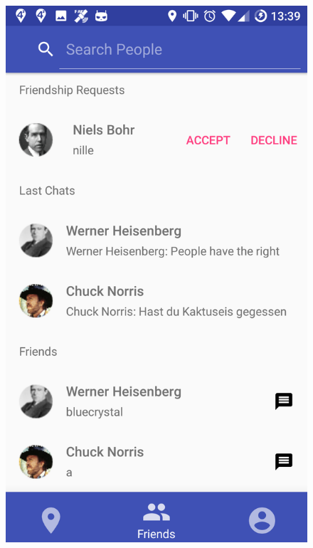 \documentclass[11pt, accentcolor=tud1c]{tudreport}
\begin{document}
\begin{figure}[h]
\begin{minipage}{.3\textwidth}
  \includegraphics[width=.8\linewidth]{./res/friends.png}
  \label{fig:friends_view}
\end{minipage}
\begin{minipage}{.3\textwidth}
  \centering

\end{minipage}
\end{figure}
\end{document}
